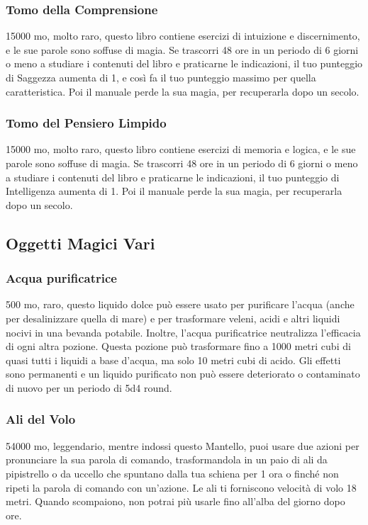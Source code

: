 \begin{multicols}{2}
	\subsubsection*{Tomo della Comprensione}
	15000 mo, molto raro, questo libro contiene esercizi di intuizione e discernimento, e le sue parole sono soffuse di magia. Se trascorri 48 ore in un periodo di 6 giorni o meno a studiare i contenuti del libro e praticarne le indicazioni, il tuo punteggio di Saggezza aumenta di 1, e così fa il tuo punteggio massimo per quella caratteristica. Poi il manuale perde la sua magia, per recuperarla dopo un secolo.

	\subsubsection*{Tomo del Pensiero Limpido}
	15000 mo, molto raro, questo libro contiene esercizi di memoria e logica, e le sue parole sono soffuse di magia. Se trascorri 48 ore in un periodo di 6 giorni o meno a studiare i contenuti del libro e praticarne le indicazioni, il tuo punteggio di Intelligenza aumenta di 1. Poi il manuale perde la sua magia, per recuperarla dopo un secolo.

	\subsection{Oggetti Magici Vari}

	\subsubsection*{Acqua purificatrice}
	500 mo, raro, questo liquido dolce può essere usato per purificare l’acqua (anche per desalinizzare quella di mare) e per trasformare veleni, acidi e altri liquidi nocivi in una bevanda potabile. Inoltre, l’acqua purificatrice neutralizza l'efficacia di ogni altra pozione. Questa pozione può trasformare fino a 1000 metri cubi di quasi tutti i liquidi a base d’acqua, ma solo 10 metri cubi di acido. Gli effetti sono permanenti e un liquido purificato non può essere deteriorato o contaminato di nuovo per un periodo di 5d4 round.

	\subsubsection*{Ali del Volo}
	54000 mo, leggendario, mentre indossi questo Mantello, puoi usare due azioni per pronunciare la sua parola di comando, trasformandola in un paio di ali da pipistrello o da uccello che spuntano dalla tua schiena per 1 ora o finché non ripeti la parola di comando con un'azione. Le ali ti forniscono velocità di volo 18 metri. Quando scompaiono, non potrai più usarle fino all'alba del giorno dopo ore.


\end{multicols}
